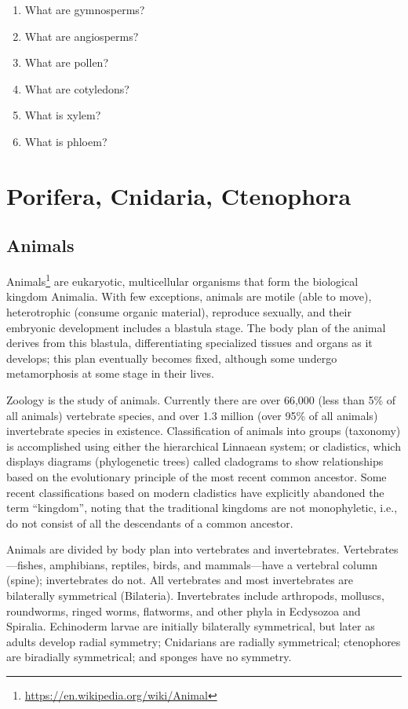 \documentclass[]{book}
\providecommand{\tightlist}{%
  \setlength{\itemsep}{0pt}\setlength{\parskip}{0pt}}
\let\rmarkdownfootnote\footnote%
\def\footnote{\protect\rmarkdownfootnote}
\renewcommand{\href}[2]{#2\footnote{\url{#1}}}
\begin{document}
\begin{enumerate}
\def\labelenumi{\arabic{enumi}.}
\tightlist
\item
  What are gymnosperms?
\item
  What are angiosperms?
\item
  What are pollen?
\item
  What are cotyledons?
\item
  What is xylem?
\item
  What is phloem?
\end{enumerate}

\hypertarget{porifera-cnidaria-ctenophora}{%
\chapter{Porifera, Cnidaria, Ctenophora}\label{porifera-cnidaria-ctenophora}}

\hypertarget{animals}{%
\section{Animals}\label{animals}}

\href{https://en.wikipedia.org/wiki/Animal}{Animals} are eukaryotic, multicellular organisms that form the biological kingdom Animalia. With few exceptions, animals are motile (able to move), heterotrophic (consume organic material), reproduce sexually, and their embryonic development includes a blastula stage. The body plan of the animal derives from this blastula, differentiating specialized tissues and organs as it develops; this plan eventually becomes fixed, although some undergo metamorphosis at some stage in their lives.

Zoology is the study of animals. Currently there are over 66,000 (less than 5\% of all animals) vertebrate species, and over 1.3 million (over 95\% of all animals) invertebrate species in existence. Classification of animals into groups (taxonomy) is accomplished using either the hierarchical Linnaean system; or cladistics, which displays diagrams (phylogenetic trees) called cladograms to show relationships based on the evolutionary principle of the most recent common ancestor. Some recent classifications based on modern cladistics have explicitly abandoned the term ``kingdom'', noting that the traditional kingdoms are not monophyletic, i.e., do not consist of all the descendants of a common ancestor.

Animals are divided by body plan into vertebrates and invertebrates. Vertebrates---fishes, amphibians, reptiles, birds, and mammals---have a vertebral column (spine); invertebrates do not. All vertebrates and most invertebrates are bilaterally symmetrical (Bilateria). Invertebrates include arthropods, molluscs, roundworms, ringed worms, flatworms, and other phyla in Ecdysozoa and Spiralia. Echinoderm larvae are initially bilaterally symmetrical, but later as adults develop radial symmetry; Cnidarians are radially symmetrical; ctenophores are biradially symmetrical; and sponges have no symmetry.
\end{document}
